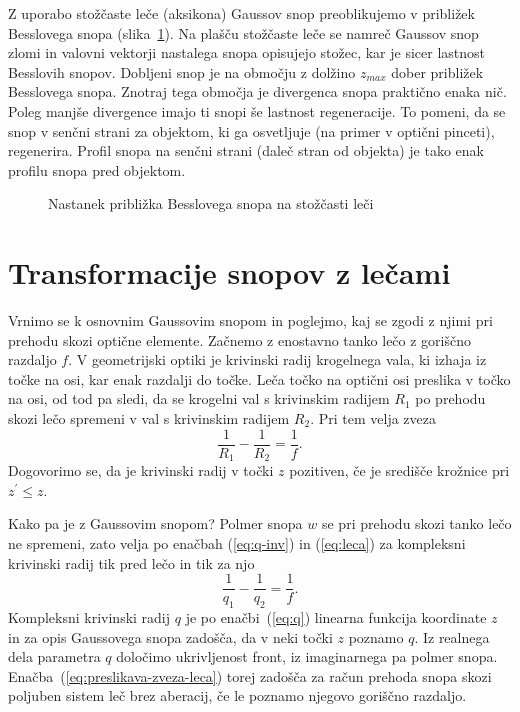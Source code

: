 \begin{remark}
Z uporabo stožčaste leče (aksikona) Gaussov snop
preoblikujemo v približek Besslovega snopa (slika~\ref{fig:Bessel_leca}). 
Na plašču stožčaste leče se namreč Gaussov snop zlomi in valovni vektorji 
nastalega snopa opisujejo stožec, kar je sicer lastnost Besslovih snopov.
Dobljeni snop je na območju z dolžino $z_{max}$ dober približek Besslovega snopa.
Znotraj tega območja je divergenca snopa praktično enaka nič. Poleg manjše divergence
imajo ti snopi še lastnost regeneracije. To pomeni, da se snop v senčni strani
za objektom, ki ga osvetljuje (na primer v optični pinceti), regenerira. 
Profil snopa na senčni strani (daleč stran od objekta) je tako enak profilu 
snopa pred objektom. 
\begin{figure}[h]
\centering
\def\svgwidth{90truemm} 

\caption{Nastanek približka Besslovega snopa na stožčasti leči}
\label{fig:Bessel_leca}
\end{figure}
\end{remark}

\section{Transformacije snopov z lečami}

Vrnimo se k osnovnim Gaussovim snopom in poglejmo, kaj se zgodi z njimi pri prehodu
skozi optične elemente. Začnemo
z enostavno tanko lečo z goriščno razdaljo $f$. V geometrijski optiki
je krivinski radij krogelnega vala, ki izhaja iz točke na osi, kar
enak razdalji do točke. Leča točko na optični osi preslika v točko na osi,
od tod pa sledi, da se krogelni val s krivinskim radijem $R_{1}$
po prehodu skozi lečo spremeni v val s krivinskim radijem $R_{2}$.
Pri tem velja zveza 
\begin{equation}
\frac{1}{R_{1}}-\frac{1}{R_{2}}=\frac{1}{f}.
\label{eq:leca}
\end{equation}
Dogovorimo se, da je krivinski radij v točki $z$ pozitiven, če je središče krožnice pri $z^{\prime}\le z$.

Kako pa je z Gaussovim snopom? Polmer snopa $w$ se pri prehodu 
skozi tanko lečo ne spremeni, zato velja po enačbah (\ref{eq:q-inv}) in 
(\ref{eq:leca}) za kompleksni krivinski radij tik pred lečo in tik za njo
\begin{equation}
\frac{1}{q_{1}}-\frac{1}{q_{2}}=\frac{1}{f}.
\label{eq:preslikava-zveza-leca}
\end{equation}
Kompleksni krivinski radij $q$ je po enačbi~(\ref{eq:q}) linearna 
funkcija koordinate $z$ in za opis Gaussovega snopa zadošča, da
v neki točki $z$ poznamo $q$. Iz realnega dela parametra $q$ določimo ukrivljenost front, iz 
imaginarnega pa polmer snopa. Enačba~(\ref{eq:preslikava-zveza-leca}) torej
zadošča za račun prehoda snopa skozi poljuben sistem leč brez aberacij, če le poznamo
njegovo goriščno razdaljo.

